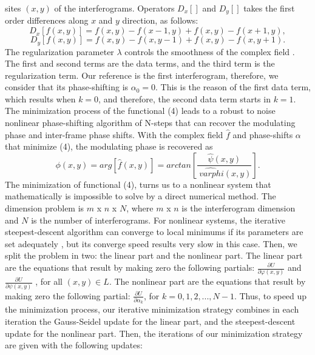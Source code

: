sites $(x,y)$ of the interferograms. Operators $D_{x}[]$ and $D_{y}[]$
takes the first order differences along $x$ and $y$ direction, as
follows:
\begin{equation}
D_{x}[f(x,y)]=f(x,y)-f(x-1,y)+f(x,y)-f(x+1,y),
\end{equation}
\begin{equation}
D_{y}[f(x,y)]=f(x,y)-f(x,y-1)+f(x,y)-f(x,y+1).
\end{equation}
The regularization parameter $\lambda$ controls the smoothness of
the complex field \cite{a18,a19}. The first and second terms are
the data terms, and the third term is the regularization term. Our
reference is the first interferogram, therefore, we consider that
its phase-shifting is $\alpha_{0}=0$. This is the reason of the first
data term, which results when $k=0$, and therefore, the second data
term starts in $k=1$. The minimization process of the functional
(4) leads to a robust to noise nonlinear phase-shifting algorithm
of N-steps that can recover the modulating phase and inter-frame phase
shifts. With the complex field $\widehat{f}$ and phase-shifts $\alpha$
that minimize (4), the modulating phase is recovered as 
\begin{equation}
\phi(x,y)=arg[\widehat{f}(x,y)]=arctan\left[\frac{\hat{\psi}(x,y)}{\widehat{\
varphi}(x,y)}\right].\label{eq:fi}
\end{equation}
The minimization of functional (4), turns us to a nonlinear system
that mathematically is impossible to solve by a direct numerical method.
The dimension problem is $m$ x $n$ x $N$, where $m$ x $n$ is
the interferogram dimension and $N$ is the number of interferograms.
For nonlinear systems, the iterative\emph{ }steepest-descent algorithm
can converge to local minimums if its parameters are set adequately
\cite{a21}, but its converge speed results very slow in this case.
Then, we split the problem in two: the linear part and the nonlinear
part. The linear part are the equations that result by making zero
the following partials: $\frac{\partial U}{\partial\varphi(x,y)}$
and $\frac{\partial U}{\partial\psi(x,y)}$ , for all $(x,y)\in L$.
The nonlinear part are the equations that result by making zero the
following partial: $\frac{\partial U}{\partial\alpha_{k}}$, for $k=0,1,2,...,N-
1$.
Thus, to speed up the minimization process, our iterative minimization
strategy combines in each iteration the Gauss-Seidel update for the
linear part, and the steepest-descent update for the nonlinear part.
Then, the iterations of our minimization strategy are given with the
following updates: 

